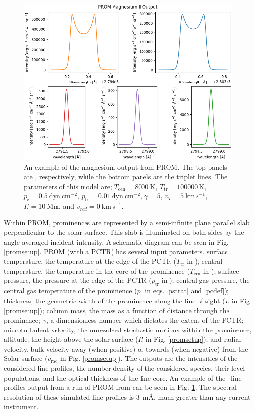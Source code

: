 \begin{figure}
    \centering
    \includegraphics[width=0.9\linewidth]{./02Modelling1D/figs/20180419/promexample2.png}
    \caption[An example of the magnesium output from PROM.]{An example of the magnesium output from PROM. The top panels are \mgiihk{}, respectively, while the bottom panels are the \mgii{} triplet lines. The parameters of this model are; $T_\text{cen}=8000~$K, $T_\text{tr}=100000~$K, $p_\text{c}=0.5~$dyn$~$cm$^{-2}$, $p_\text{tr}=0.01~$dyn$~$cm$^{-2}$, $\gamma=5$, $v_T=5~$km$~$s$^{-1}$, $H=10~$Mm, and $v_{rad}=0~$km$~$s$^{-1}$.}
    \label{promexample}
\end{figure}

Within PROM, prominences are represented by a semi-infinite plane parallel slab perpendicular to the solar surface. This slab is illuminated on both sides by the angle-averaged incident intensity. A schematic diagram can be seen in Fig. \ref{promsetup}. PROM (with a PCTR) has several input parameters. surface temperature, the temperature at the edge of the PCTR ($T_{\text{tr}}$ in ); central temperature, the temperature in the core of the prominence ($T_{\text{cen}}$ in ); surface pressure, the pressure at the edge of the PCTR ($p_{\text{tr}}$ in ); central gas pressure, the central gas temperature of the prominence ($p_{\text{c}}$ in eqs. \ref{pstrat} and \ref{pcdef}); thickness, the geometric width of the prominence along the line of sight ($L$ in Fig. \ref{promsetup}); column mass, the mass as a function of distance through the prominence; $\gamma$, a dimensionless number which dictates the extent of the PCTR; microturbulent velocity, the unresolved stochastic motions within the prominence; altitude, the height above the solar surface ($H$ in Fig. \ref{promsetup}); and radial velocity, bulk velocity away (when positive) or towards (when negative) from the Solar surface ($v_\text{rad}$ in Fig. \ref{promsetup}). The outputs are the intensities of the considered line profiles, the number density of the considered species, their level populations, and the optical thickness of the line core. An example of the \mgii\ line profiles output from a run of PROM from \cite{levens_modelling_2019} can be seen in Fig. \ref{promexample}. The spectral resolution of these simulated line profiles is 3~m\AA, much greater than any current instrument.

